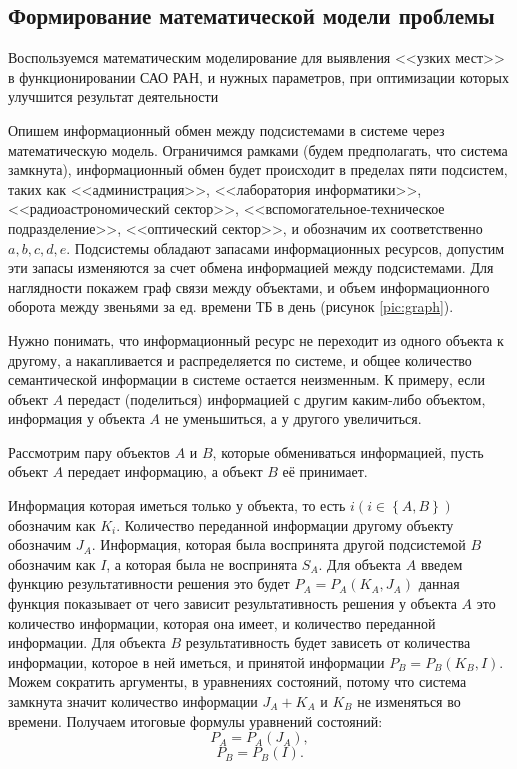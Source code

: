 \subsection{Формирование математической модели проблемы}
Воспользуемся математическим моделирование для выявления <<узких мест>> в функционировании САО РАН, и нужных параметров, при оптимизации которых улучшится результат деятельности

Опишем информационный обмен между подсистемами в системе через математическую модель. Ограничимся рамками (будем предполагать, что система замкнута), информационный обмен будет  происходит в пределах пяти подсистем, таких как <<администрация>>, <<лаборатория информатики>>, <<радиоастрономический сектор>>, <<вспомогательное-техническое подразделение>>, <<оптический сектор>>, и обозначим их соответственно $a, b, c, d, e$. Подсистемы обладают запасами информационных ресурсов, допустим эти запасы изменяются за счет обмена информацией между подсистемами. Для наглядности покажем граф связи между объектами, и объем информационного оборота между звеньями за ед. времени ТБ в день (рисунок \ref{pic:graph}).




Нужно понимать, что информационный ресурс не переходит из одного объекта к другому, а накапливается и распределяется по системе, и общее количество семантической информации в системе остается неизменным. К примеру, если объект $A$ передаст (поделиться) информацией с другим каким-либо объектом, информация у объекта $A$ не уменьшиться, а у другого увеличиться.

Рассмотрим пару объектов $A$ и $B$, которые обмениваться информацией, пусть объект $A$ передает информацию, а объект $B$ её принимает.

Информация которая иметься только у объекта, то есть  $i \left( i \in \left\{A,B \right\} \right)$ обозначим как $K_i$. Количество переданной информации другому объекту обозначим $J_A$. Информация, которая была воспринята другой подсистемой $B$ обозначим как $I$, а которая была не воспринята $S_A$. Для объекта $A$ введем функцию результативности решения это будет $P_A=P_A(K_A,J_A)$ данная функция показывает от чего зависит результативность решения у объекта $A$ 	это количество информации, которая она имеет, и количество переданной информации. Для объекта $B$ результативность будет зависеть от количества информации, которое в ней иметься, и принятой информации $P_B=P_B(K_B,I)$. 
Можем сократить аргументы, в уравнениях состояний, потому что система замкнута значит количество информации $J_A+K_A$ и $K_B$ не изменяться во времени. Получаем итоговые формулы уравнений состояний:
\begin{equation}\label{eq:sost1}
P_A=P_A(J_A),
\end{equation}
\begin{equation}\label{eq:sost2}
P_B=P_B(I). 
\end{equation}

